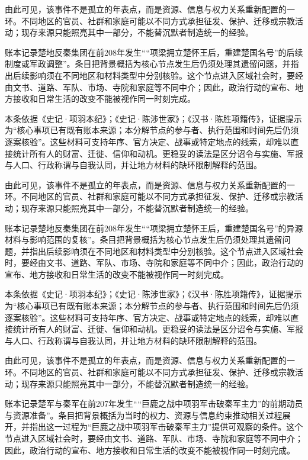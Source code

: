 由此可见，该事件不是孤立的年表点，而是资源、信息与权力关系重新配置的一环。不同地区的官员、社群和家庭可能以不同方式承担征发、保护、迁移或宗教活动；现存来源只能照亮其中一部分，不能替沉默者制造统一的经验。

账本记录楚地反秦集团在前208年发生““项梁拥立楚怀王后，重建楚国名号”的后续制度或军政调整”。条目把背景概括为核心节点发生后仍须处理其遗留问题，并指出后续影响须在不同地区和材料类型中分别核验。这个节点进入区域社会时，要经由文书、道路、军队、市场、寺院和家庭等不同中介；因此，政治行动的宣布、地方接收和日常生活的改变不能被视作同一时刻完成。

本条依据《史记·项羽本纪》；《史记·陈涉世家》；《汉书·陈胜项籍传》，证据提示为“核心事项已有既有账本来源；本分解节点的参与者、执行范围和时间先后仍须逐案核验”。这些材料可支持年序、官方决定、战事或特定地点的线索，却难以直接统计所有人的财富、迁徙、信仰和动机。更稳妥的读法是区分诏令与实施、军报与人口、行政称谓与自我认同，并让地方材料的缺环限制解释的范围。

由此可见，该事件不是孤立的年表点，而是资源、信息与权力关系重新配置的一环。不同地区的官员、社群和家庭可能以不同方式承担征发、保护、迁移或宗教活动；现存来源只能照亮其中一部分，不能替沉默者制造统一的经验。

账本记录楚地反秦集团在前208年发生““项梁拥立楚怀王后，重建楚国名号”的异源材料与影响范围的复核”。条目把背景概括为核心节点发生后仍须处理其遗留问题，并指出后续影响须在不同地区和材料类型中分别核验。这个节点进入区域社会时，要经由文书、道路、军队、市场、寺院和家庭等不同中介；因此，政治行动的宣布、地方接收和日常生活的改变不能被视作同一时刻完成。

本条依据《史记·项羽本纪》；《史记·陈涉世家》；《汉书·陈胜项籍传》，证据提示为“核心事项已有既有账本来源；本分解节点的参与者、执行范围和时间先后仍须逐案核验”。这些材料可支持年序、官方决定、战事或特定地点的线索，却难以直接统计所有人的财富、迁徙、信仰和动机。更稳妥的读法是区分诏令与实施、军报与人口、行政称谓与自我认同，并让地方材料的缺环限制解释的范围。

由此可见，该事件不是孤立的年表点，而是资源、信息与权力关系重新配置的一环。不同地区的官员、社群和家庭可能以不同方式承担征发、保护、迁移或宗教活动；现存来源只能照亮其中一部分，不能替沉默者制造统一的经验。

账本记录楚军与秦军在前207年发生““巨鹿之战中项羽军击破秦军主力”的前期动员与资源准备”。条目把背景概括为当时的权力、资源与信息约束推动相关过程展开，并指出这一过程为“巨鹿之战中项羽军击破秦军主力”提供可观察的条件。这个节点进入区域社会时，要经由文书、道路、军队、市场、寺院和家庭等不同中介；因此，政治行动的宣布、地方接收和日常生活的改变不能被视作同一时刻完成。

